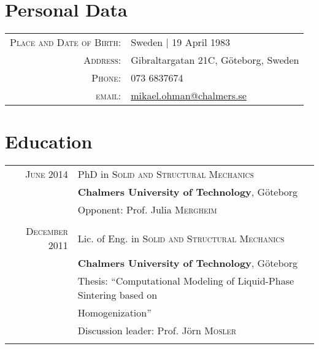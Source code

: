 \documentclass[a4paper,10pt]{article} %
\begin{document}
\pagestyle{empty} %



\par{ %

\section{Personal Data}

\begin{tabular}{rl}
\textsc{Place and Date of Birth:} & Sweden  | 19 April 1983 \\
\textsc{Address:} & Gibraltargatan 21C, Göteborg, Sweden \\
\textsc{Phone:} & 073 6837674\\
\textsc{email:} & \href{mailto:mikael.ohman@chalmers.se}{mikael.ohman@chalmers.se}
\end{tabular}


\section{Education}

\begin{tabular}{rl}


\textsc{June} 2014 & PhD in \textsc{Solid and Structural Mechanics} \\
& \textbf{Chalmers University of Technology}, Göteborg\\
& \small Opponent: Prof. Julia \textsc{Mergheim}\\
&\\


\textsc{December} 2011 & Lic. of Eng. in \textsc{Solid and Structural Mechanics} \\
& \textbf{Chalmers University of Technology}, Göteborg\\
& Thesis: ``Computational Modeling of Liquid-Phase Sintering based on \\
& Homogenization''\\
& \small Discussion leader: Prof. Jörn \textsc{Mosler}\\
&\\


\end{tabular}}
\end{document}
